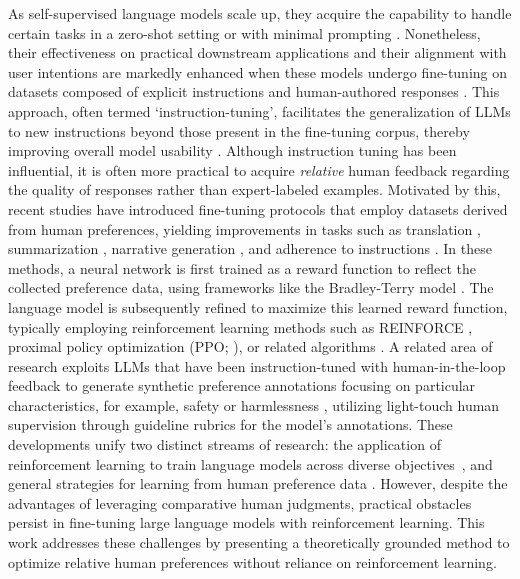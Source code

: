 As self-supervised language models scale up, they acquire the capability to handle certain tasks in a zero-shot setting \citep{radford2019language} or with minimal prompting \citep{gpt3,megatron,chowdhery2022palm}. Nonetheless, their effectiveness on practical downstream applications and their alignment with user intentions are markedly enhanced when these models undergo fine-tuning on datasets composed of explicit instructions and human-authored responses \citep{mishra-etal-2022-cross,sanh2022multitask,chung2022scaling,thoppilan2022lamda}. This approach, often termed `instruction-tuning', facilitates the generalization of LLMs to new instructions beyond those present in the fine-tuning corpus, thereby improving overall model usability \citep{chung2022scaling}. Although instruction tuning has been influential, it is often more practical to acquire \textit{relative} human feedback regarding the quality of responses rather than expert-labeled examples. Motivated by this, recent studies have introduced fine-tuning protocols that employ datasets derived from human preferences, yielding improvements in tasks such as translation \citep{kreutzer-etal-2018-reliability}, summarization \citep{stiennon2022learning,ziegler2020finetuning}, narrative generation \citep{ziegler2020finetuning}, and adherence to instructions \citep{ouyang2022training,ramamurthy2023is}. In these methods, a neural network is first trained as a reward function to reflect the collected preference data, using frameworks like the Bradley-Terry model \citep{bradley1952rankanalysis}. The language model is subsequently refined to maximize this learned reward function, typically employing reinforcement learning methods such as REINFORCE \citep{williams1992reinforce}, proximal policy optimization (PPO; \cite{schulman2017proximal}), or related algorithms \citep{ramamurthy2023is}. A related area of research exploits LLMs that have been instruction-tuned with human-in-the-loop feedback to generate synthetic preference annotations focusing on particular characteristics, for example, safety or harmlessness \citep{bai2022constitutional}, utilizing light-touch human supervision through guideline rubrics for the model's annotations. These developments unify two distinct streams of research: the application of reinforcement learning to train language models across diverse objectives~\citep{Ranzato2015SequenceLT,paulus2018a,wu2018learning}, and general strategies for learning from human preference data \citep{christiano2017deep,kupcsik2018learning}. However, despite the advantages of leveraging comparative human judgments, practical obstacles persist in fine-tuning large language models with reinforcement learning. This work addresses these challenges by presenting a theoretically grounded method to optimize relative human preferences without reliance on reinforcement learning.


